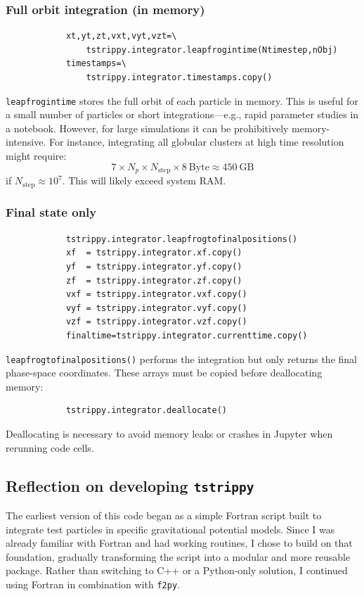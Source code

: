         \subsubsection*{Full orbit integration (in memory)}
        \small
        \begin{lstlisting}
            xt,yt,zt,vxt,vyt,vzt=\
                tstrippy.integrator.leapfrogintime(Ntimestep,nObj) 
            timestamps=\
                tstrippy.integrator.timestamps.copy()
        \end{lstlisting}
        \normalsize
        \texttt{leapfrogintime} stores the full orbit of each particle in memory. This is useful for a small number of particles or short integrations—e.g., rapid parameter studies in a notebook. However, for large simulations it can be prohibitively memory-intensive. For instance, integrating all globular clusters at high time resolution might require:
        \begin{equation}
            7 \times N_p \times N_\mathrm{step} \times 8~\mathrm{Byte} \approx 450~\mathrm{GB}
        \end{equation}
        if $N_\mathrm{step} \approx 10^7$. This will likely exceed system RAM.

        \subsubsection*{Final state only}
        \small
        \begin{lstlisting}
            tstrippy.integrator.leapfrogtofinalpositions()
            xf  = tstrippy.integrator.xf.copy()
            yf  = tstrippy.integrator.yf.copy()
            zf  = tstrippy.integrator.zf.copy()
            vxf = tstrippy.integrator.vxf.copy()
            vyf = tstrippy.integrator.vyf.copy()
            vzf = tstrippy.integrator.vzf.copy()
            finaltime=tstrippy.integrator.currenttime.copy()
        \end{lstlisting}
        \normalsize
        \texttt{leapfrogtofinalpositions()} performs the integration but only returns the final phase-space coordinates. These arrays must be copied before deallocating memory:
        \small
        \begin{lstlisting}
            tstrippy.integrator.deallocate()
        \end{lstlisting}
        \normalsize
        Deallocating is necessary to avoid memory leaks or crashes in Jupyter when rerunning code cells.

    \subsection{Reflection on developing \texttt{tstrippy}}
        The earliest version of this code began as a simple Fortran script built to integrate test particles in specific gravitational potential models. Since I was already familiar with Fortran and had working routines, I chose to build on that foundation, gradually transforming the script into a modular and more reusable package. Rather than switching to C++ or a Python-only solution, I continued using Fortran in combination with \texttt{f2py}.

